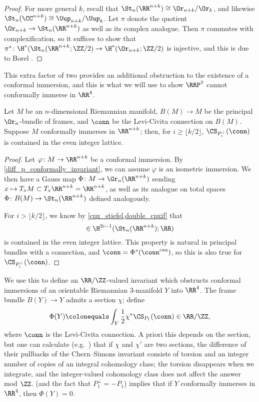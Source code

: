 \begin{proof}
	For more general $k$, recall that $\St_n(\RR^{n+k}) \cong \Or_{n+k}/\Or_k$, and likewise $\St_n(\CC^{n+k}) \cong
	\Uup_{n+k}/\Uup_k$. Let $\pi$ denote the quotient $\Or_{n+k}\to\St_n(\RR^{n+k})$ as well as its complex analogue.
	Then $\pi$ commutes with complexification, so it suffices to show that
	$\pi^*\colon\H^*(\St_n(\RR^{n+k};\ZZ/2)\to\H^*(\Or_{n+k};\ZZ/2)$ is injective, and this is due to Borel \cite[\S
	10]{Bor53}.
\end{proof}
	
This extra factor of two provides an additional obstruction to the existence of a conformal immersion, and this is
what we will use to show $\RRP^3$ cannot conformally immerse in $\RR^4$. 

\begin{thm}[{\cite[Theorem 5.14]{cs}}]
	\label{extra_factor_of_two}
	Let $M$ be an $n$-dimensional Riemannian manifold, $B(M)\to M$ be the principal $\Or_n$-bundle of 
	frames, and $\conn$ be the Levi-Civita connection on $B(M)$. Suppose $M$ conformally immerses in $\RR^{n+k}$;
	then, for $i\ge \lfloor k/2\rfloor$, $\CS_{P_i^\perp}(\conn)$ is contained in the even integer lattice.
\end{thm}

\begin{proof}
	Let $\varphi\colon M\to\RR^{n+k}$ be a conformal immersion. By \cref{diff_p_conformally_invariant}, we can assume
	$\varphi$ is an isometric immersion. We then have a Gauss map $\Phi\colon M\to\Gr_n(\RR^{n+k})$ sending $x\mapsto
	T_xM\subset T_x\RR^{n+k} = \RR^{n+k}$, as well as its analogue on total spaces $\Phi\colon B(M)\to\St_n(\RR^{n+k})$
	defined analogously.

	For $i > \lfloor k/2\rfloor$, we know by \cref{cpx_stiefel,double_cpxif} that
	\begin{equation*}
		[\CS_{P_i^\perp}(\conn^{\mathrm{can}})]\in \H^{2i-1}(\St_n(\RR^{n+k});\RR) 
	\end{equation*}
	is contained in the even integer
	lattice. This property is natural in principal bundles with a connection, and $\conn =
	\Phi^*(\conn^{\mathrm{can}})$, so this is also true for $\CS_{P_i^\perp}(\conn)$.
\end{proof}

We use this to define an $\RR/\ZZ$-valued invariant which obstructs conformal immersions of an orientable
Riemannian $3$-manifold $Y$ into $\RR^4$. The frame bundle $B(Y)\to Y$ admits a section $\chi$; define
\begin{equation}
	\Phi(Y) \colonequals \int_Y \frac 12 \chi^*\CS_{P_1}(\conn)\in\RR/\ZZ,
\end{equation}
where $\conn$ is the Levi-Civita connection. A priori this depends on the section, but one can calculate (e.g.\
\cite[\S 6]{cs}) that if $\chi$ and $\chi'$ are two sections, the difference of their pullbacks of the
Chern--Simons invariant consists of torsion and an integer number of copies of an integral cohomology class; the
torsion disappears when we integrate, and the integer-valued cohomology class does not affect the answer mod $\ZZ$.
\Cref{extra_factor_of_two} (and the fact that $P_1^\perp = -P_1$) implies that if $Y$ conformally immerses in
$\RR^4$, then $\Phi(Y) = 0$.

